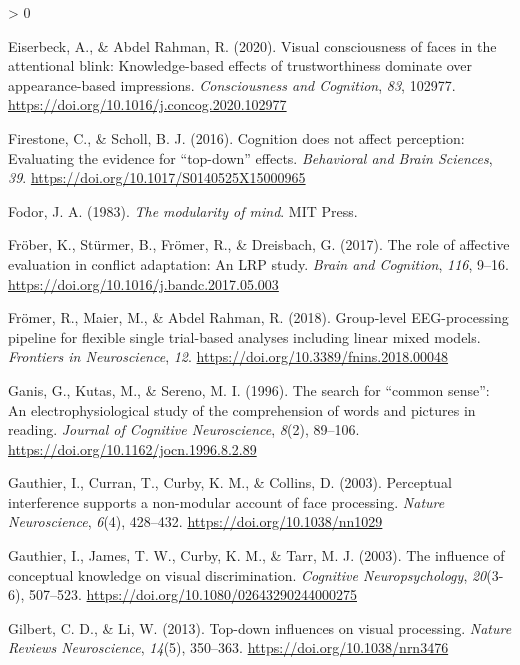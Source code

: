 \documentclass[
  english,
  doc,12pt,twoside,floatsintext]{apa7}
\newlength{\cslhangindent}
\newenvironment{CSLReferences}[2] %
 {%
  \setlength{\parindent}{0pt}
  \ifodd #1 \everypar{\setlength{\hangindent}{\cslhangindent}}\ignorespaces\fi
  \ifnum #2 > 0
  \setlength{\parskip}{#2\baselineskip}
  \fi
 }%
 {}
\begin{document}
\begin{CSLReferences}{1}{0}
\leavevmode\hypertarget{ref-eiserbeck2020}{}%
Eiserbeck, A., \& Abdel Rahman, R. (2020). Visual consciousness of faces in the attentional blink: Knowledge-based effects of trustworthiness dominate over appearance-based impressions. \emph{Consciousness and Cognition}, \emph{83}, 102977. \url{https://doi.org/10.1016/j.concog.2020.102977}

\leavevmode\hypertarget{ref-firestone2016}{}%
Firestone, C., \& Scholl, B. J. (2016). Cognition does not affect perception: Evaluating the evidence for {``top-down''} effects. \emph{Behavioral and Brain Sciences}, \emph{39}. \url{https://doi.org/10.1017/S0140525X15000965}

\leavevmode\hypertarget{ref-fodor1983}{}%
Fodor, J. A. (1983). \emph{The modularity of mind}. MIT Press.

\leavevmode\hypertarget{ref-fruxf6ber2017}{}%
Fröber, K., Stürmer, B., Frömer, R., \& Dreisbach, G. (2017). The role of affective evaluation in conflict adaptation: An {LRP} study. \emph{Brain and Cognition}, \emph{116}, 9--16. \url{https://doi.org/10.1016/j.bandc.2017.05.003}

\leavevmode\hypertarget{ref-fruxf6mer2018}{}%
Frömer, R., Maier, M., \& Abdel Rahman, R. (2018). Group-level {EEG}-processing pipeline for flexible single trial-based analyses including linear mixed models. \emph{Frontiers in Neuroscience}, \emph{12}. \url{https://doi.org/10.3389/fnins.2018.00048}

\leavevmode\hypertarget{ref-ganis1996}{}%
Ganis, G., Kutas, M., \& Sereno, M. I. (1996). The search for {``common sense''}: An electrophysiological study of the comprehension of words and pictures in reading. \emph{Journal of Cognitive Neuroscience}, \emph{8}(2), 89--106. \url{https://doi.org/10.1162/jocn.1996.8.2.89}

\leavevmode\hypertarget{ref-gauthier2003a}{}%
Gauthier, I., Curran, T., Curby, K. M., \& Collins, D. (2003). Perceptual interference supports a non-modular account of face processing. \emph{Nature Neuroscience}, \emph{6}(4), 428--432. \url{https://doi.org/10.1038/nn1029}

\leavevmode\hypertarget{ref-gauthier2003}{}%
Gauthier, I., James, T. W., Curby, K. M., \& Tarr, M. J. (2003). The influence of conceptual knowledge on visual discrimination. \emph{Cognitive Neuropsychology}, \emph{20}(3-6), 507--523. \url{https://doi.org/10.1080/02643290244000275}

\leavevmode\hypertarget{ref-gilbert2013}{}%
Gilbert, C. D., \& Li, W. (2013). Top-down influences on visual processing. \emph{Nature Reviews Neuroscience}, \emph{14}(5), 350--363. \url{https://doi.org/10.1038/nrn3476}


\end{CSLReferences}
\end{document}
